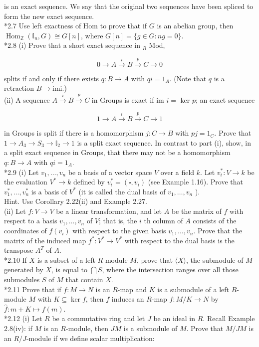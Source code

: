 \documentclass[10pt]{article}
\begin{document}
is an exact sequence. We say that the original two sequences have been spliced to form the new exact sequence.\\
*2.7 Use left exactness of Hom to prove that if $G$ is an abelian group, then $\operatorname{Hom}_{\mathbb{Z}}\left(\mathbb{I}_{n}, G\right) \cong G[n]$, where $G[n]=\{g \in G: n g=0\}$.\\
*2.8 (i) Prove that a short exact sequence in ${ }_{R}$ Mod,

$$
0 \rightarrow A \xrightarrow{i} B \xrightarrow{p} C \rightarrow 0
$$

splits if and only if there exists $q: B \rightarrow A$ with $q i=1_{A}$. (Note that $q$ is a retraction $B \rightarrow \mathrm{imi}$.)\\
(ii) A sequence $A \xrightarrow{i} B \xrightarrow{p} C$ in Groups is exact if im $i=$ ker $p$; an exact sequence

$$
1 \rightarrow A \xrightarrow{i} B \xrightarrow{p} C \rightarrow 1
$$

in Groups is split if there is a homomorphism $j: C \rightarrow B$ with $p j=1_{C}$. Prove that $1 \rightarrow A_{3} \rightarrow S_{3} \rightarrow \mathbb{I}_{2} \rightarrow 1$ is a split exact sequence. In contrast to part (i), show, in a split exact sequence in Groups, that there may not be a homomorphism $q: B \rightarrow A$ with $q i=1_{A}$.\\
*2.9 (i) Let $v_{1}, \ldots, v_{n}$ be a basis of a vector space $V$ over a field $k$. Let $v_{i}^{*}: V \rightarrow k$ be the evaluation $V^{*} \rightarrow k$ defined by $v_{i}^{*}=\left(\square, v_{i}\right)$ (see Example 1.16). Prove that $v_{1}^{*}, \ldots, v_{n}^{*}$ is a basis of $V^{*}$ (it is called the dual basis of $v_{1}, \ldots, v_{n}$ ).\\
Hint. Use Corollary 2.22(ii) and Example 2.27.\\
(ii) Let $f: V \rightarrow V$ be a linear transformation, and let $A$ be the matrix of $f$ with respect to a basis $v_{1}, \ldots, v_{n}$ of $V$; that is, the $i$ th column of $A$ consists of the coordinates of $f\left(v_{i}\right)$ with respect to the given basis $v_{1}, \ldots, v_{n}$. Prove that the matrix of the induced map $f^{*}: V^{*} \rightarrow V^{*}$ with respect to the dual basis is the transpose $A^{T}$ of $A$.\\
*2.10 If $X$ is a subset of a left $R$-module $M$, prove that $\langle X\rangle$, the submodule of $M$ generated by $X$, is equal to $\bigcap S$, where the intersection ranges over all those submodules $S$ of $M$ that contain $X$.\\
*2.11 Prove that if $f: M \rightarrow N$ is an $R$-map and $K$ is a submodule of a left $R$-module $M$ with $K \subseteq \operatorname{ker} f$, then $f$ induces an $R$-map $\widehat{f}: M / K \rightarrow N$ by $\widehat{f}: m+K \mapsto f(m)$.\\
*2.12 (i) Let $R$ be a commutative ring and let $J$ be an ideal in $R$. Recall Example 2.8(iv): if $M$ is an $R$-module, then $J M$ is a submodule of $M$. Prove that $M / J M$ is an $R / J$-module if we define scalar multiplication:
\end{document}
